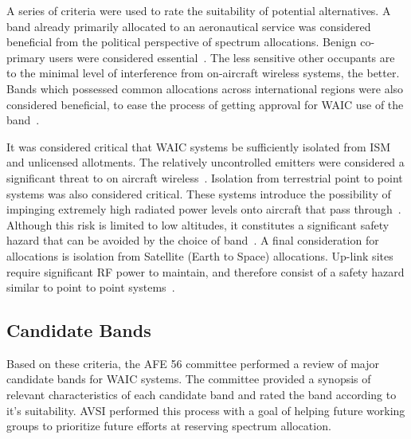 A series of criteria were used to rate the suitability of potential alternatives. A band already primarily allocated to an aeronautical service was considered beneficial from the political perspective of spectrum allocations. Benign co-primary users were considered essential~\cite{ferrell_feasibility_2007}. The less sensitive other occupants are to the minimal level of interference from on-aircraft wireless systems, the better. Bands which possessed common allocations across international regions were also considered beneficial, to ease the process of getting approval for WAIC use of the band~\cite{ferrell_feasibility_2007}. 

It was considered critical that WAIC systems be sufficiently isolated from ISM and unlicensed allotments. The relatively uncontrolled emitters were considered a significant threat to on aircraft wireless~\cite{ferrell_feasibility_2007}. Isolation from terrestrial point to point systems was also considered critical. These systems introduce the possibility of impinging extremely high radiated power levels onto aircraft that pass through~\cite{ferrell_feasibility_2007}. Although this risk is limited to low altitudes, it constitutes a significant safety hazard that can be avoided by the choice of band~\cite{ferrell_feasibility_2007}. A final consideration for allocations is isolation from Satellite (Earth to Space) allocations. Up-link sites require significant RF power to maintain, and therefore consist of a safety hazard similar to point to point systems~\cite{ferrell_feasibility_2007}. 

\subsection{Candidate Bands}
Based on these criteria, the AFE 56 committee performed a review of major candidate bands for WAIC systems. The committee provided a synopsis of relevant characteristics of each candidate band and rated the band according to it's suitability. AVSI performed this process with a goal of helping future working groups to prioritize future efforts at reserving spectrum allocation. 

